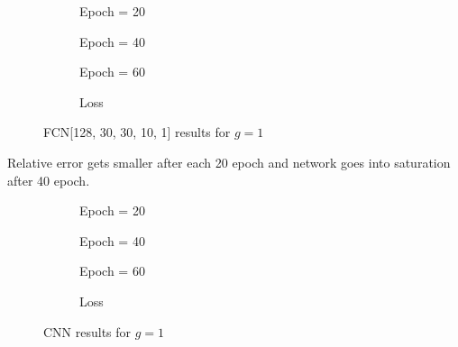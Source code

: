 \documentclass[a4paper,times,12pt]{article}
\begin{document}
\begin{figure}[H]
    \centering
    \begin{subfigure}[t]{0.45\textwidth}
		\centering
        
        \caption{Epoch = 20}
		\label{fig:a}
    \end{subfigure}
    \begin{subfigure}[t]{0.45\textwidth}
		\centering
        
        \caption{Epoch = 40}
		\label{fig:b}
    \end{subfigure}    
    \begin{subfigure}[t]{0.45\textwidth}
        \centering
        
        \caption{Epoch = 60}
		\label{fig:c}
    \end{subfigure}
    \begin{subfigure}[t]{0.45\textwidth}
        \centering
        
        \caption{Loss}
		\label{fig:c}
    \end{subfigure}
	\caption{FCN[128, 30, 30, 10, 1] results for $g = 1$}
\label{fig:FFN-g-1}
\end{figure}

Relative error gets smaller after each 20 epoch and network goes into saturation after 40 epoch.

\begin{figure}[H]
    \centering
    \begin{subfigure}[t]{0.45\textwidth}
		\centering
        
        \caption{Epoch = 20}
		\label{fig:a}
    \end{subfigure}
    \begin{subfigure}[t]{0.45\textwidth}
		\centering
        
        \caption{Epoch = 40}
		\label{fig:b}
    \end{subfigure}    
    \begin{subfigure}[t]{0.45\textwidth}
        \centering
        
        \caption{Epoch = 60}
		\label{fig:c}
    \end{subfigure}
    \begin{subfigure}[t]{0.45\textwidth}
        \centering
        
        \caption{Loss}
		\label{fig:c}
    \end{subfigure}
	\caption{CNN results for $g = 1$}
\label{fig:CNN-g-1}
\end{figure}
\end{document}
